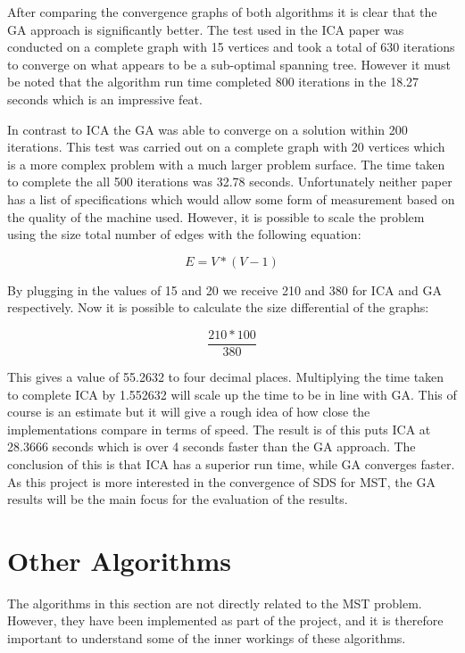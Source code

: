 \documentclass{AISB2008}
\begin{document}
{After comparing the convergence graphs of both algorithms it is clear that the GA approach is significantly better. The test used in the ICA paper was conducted on a complete graph with 15 vertices and took a total of 630 iterations to converge on what appears to be a sub-optimal spanning tree. However it must be noted that the algorithm run time completed 800 iterations in the 18.27 seconds which is an impressive feat.

In contrast to ICA the GA was able to converge on a solution within 200 iterations. This test was carried out on a complete graph with 20 vertices which is a more complex problem with a much larger problem surface. The time taken to complete the all 500 iterations was 32.78 seconds. Unfortunately neither paper has a list of specifications which would allow some form of measurement based on the quality of the machine used. However, it is possible to scale the problem using the size total number of edges with the following equation:

\begin{equation}
E = V * (V - 1)
\end{equation}

By plugging in the values of 15 and 20 we receive 210 and 380 for ICA and GA respectively. Now it is possible to calculate the size differential of the graphs:

\begin{equation}
\frac{210 * 100}{380}
\end{equation}

This gives a value of 55.2632 to four decimal places. Multiplying the time taken to complete ICA by 1.552632 will scale up the time to be in line with GA. This of course is an estimate but it will give a rough idea of how close the implementations compare in terms of speed. The result is of this puts ICA at 28.3666 seconds which is over 4 seconds faster than the GA approach.
The conclusion of this is that ICA has a superior run time, while GA converges faster. As this project is more interested in the convergence of SDS for MST, the GA results will be the main focus for the evaluation of the results.


\section{Other Algorithms}
The algorithms in this section are not directly related to the MST problem. However, they have been implemented as part of the project, and it is therefore important to understand some of the inner workings of these algorithms.

}
\end{document}
